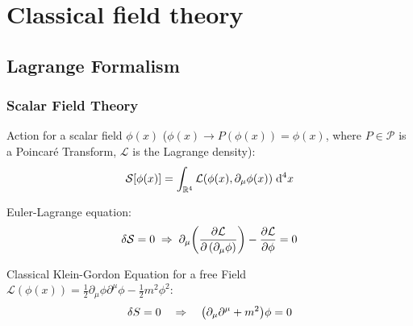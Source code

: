 \section{Classical field theory}
	\subsection{Lagrange Formalism}
		\subsubsection{Scalar Field Theory}
			\noindent 
			Action for a scalar field $\phi(x)$ (\ie $\phi(x)\rightarrow P(\phi(x))=\phi(x)$, where $P\in\mathcal{P}$ is a Poincaré Transform, $\mathcal{L}$ is the Lagrange density):
			\begin{equation}
				\mathcal{S}\qty[\phi(x)] = \int_{\mathbb{R}^4} \mathcal{L}(\phi(x),\partial_\mu \phi(x)) \;\dd^4 x				
			\end{equation}
			
			\noindent
			Euler-Lagrange equation:
			\begin{equation}
				\delta\mathcal{S} = 0
				\;\Rightarrow\; \partial_\mu \qty(\pdv{\mathcal{L}}{\left(\partial_\mu \phi\right)}) - \pdv{\mathcal{L}}{\phi} = 0
			\end{equation}
			
			\noindent
			Classical Klein-Gordon Equation for a free Field $\mathcal{L}(\phi(x)) = \frac{1}{2} \partial_\mu\phi \partial^\mu\phi - \frac{1}{2}m^2\phi^2$:
			\begin{equation}
				\delta S = 0 \quad \Rightarrow \quad \qty(\partial_\mu \partial^\mu + m^2)\phi = 0
			\end{equation}


